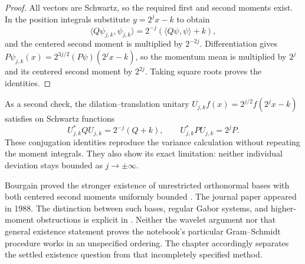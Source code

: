 \begin{proof}
All vectors are Schwartz, so the required first and second moments
exist. In the position integrals substitute $y=2^jx-k$ to obtain
\[
 \langle Q\psi_{j,k},\psi_{j,k}\rangle
 =2^{-j}(\langle Q\psi,\psi\rangle+k),
\]
and the centered second moment is multiplied by $2^{-2j}$.
Differentiation gives
$P\psi_{j,k}(x)=2^{3j/2}(P\psi)(2^jx-k)$, so the momentum mean is
multiplied by $2^j$ and its centered second moment by $2^{2j}$.
Taking square roots proves the identities.
\end{proof}

As a second check, the dilation--translation unitary
$U_{j,k}f(x)=2^{j/2}f(2^jx-k)$ satisfies on Schwartz functions
\[
 U_{j,k}^*QU_{j,k}=2^{-j}(Q+k),\qquad
 U_{j,k}^*PU_{j,k}=2^jP.
\]
These conjugation identities reproduce the variance calculation
without repeating the moment integrals. They also show its exact
limitation: neither individual deviation stays bounded as
$j\to\pm\infty$.

Bourgain proved the stronger existence of unrestricted orthonormal
bases with both centered second moments uniformly bounded
\citep[main theorem; IHES preprint, November 1986]{bourgain1988uncertainty}.
The journal paper appeared in 1988. The distinction between such
bases, regular Gabor systems, and higher-moment obstructions is
explicit in \citet[pp.~115--116 and Thm.~1.1]{grochenigmalinnikova2013localization}.
Neither the wavelet argument nor that general existence statement
proves the notebook's particular Gram--Schmidt procedure works in
an unspecified ordering. The chapter accordingly separates the
settled existence question from that incompletely specified method.
